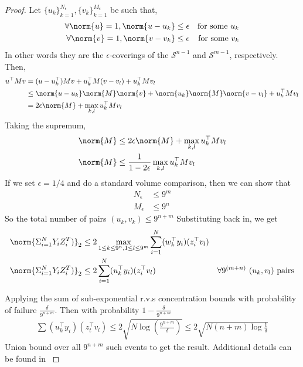 \documentclass{article}[12pt]
\begin{document}
\begin{proof}
	Let $\{u_k\}_{k=1}^{N_\epsilon}, \{v_k\}_{k=1}^{M_\epsilon}$ be such that,
	\begin{align*}
	\forall \norm{u} =1, \norm{u- u_k} &\leq \epsilon & \text {for some $u_k$}\\
	\forall \norm{v} =1, \norm{v- v_k} &\leq \epsilon & \text {for some $v_k$}
	\end{align*} 
	In other words they are the $\epsilon$-coverings of the $\mathcal{S}^{n-1}$ and $\mathcal{S}^{m-1}$, respectively. 
	Then,
	\begin{align*}
	u^\top M v &= (u-u_k^\top)Mv + u_k^\top M(v-v_l) + u_k^\top Mv_l \\
	&\leq \norm{u-u_k}\norm{M}\norm{v} + \norm{u_k}\norm{M}\norm{v-v_l} + u_k^\top Mv_l \\
	& = 2\epsilon\norm{M} + \max_{k,l} u_k^\top Mv_l
	\end{align*} 
	Taking the supremum, 
	\begin{align*}
	\norm{M} &\leq 2\epsilon \norm{M} + \max_{k,l} u_k^\top Mv_l\\
	\norm{M} &\leq \frac{1}{1-2\epsilon}\max_{k,l} u_k^\top Mv_l
	\end{align*}
	If we set $\epsilon= 1/4$ and do a standard volume comparison, then we can show that
	\begin{align*}
	N_\epsilon &\leq 9^m \\
	M_\epsilon &\leq 9^n
	\end{align*}
	So the total number of pairs $(u_k, v_k) \leq 9^{n+m}$  
	Substituting back in, we get 
	\begin{align*}
	\norm{\Sigma_{i=1}^N Y_i Z_i^T) }_2 &\leq 2 \max_{1 \leq k \leq 9^n, 1\leq l \leq 9^m} \sum_{i=1}^{N} (w_k^\top y_i )(z_i^\top v_l) \\
	\norm{\Sigma_{i=1}^N Y_i Z_i^T) }_2 &\leq 2 \sum_{i=1}^{N} (u_k^\top y_i)(z_i^\top v_l) & \text{$\forall 9^{(m+n)}$ $(u_k,v_l)$ pairs}
	\end{align*}
	
	Applying the sum of sub-exponential r.v.s concentration bounds with probability of failure $\frac{\delta}{9^{n+m}}$. Then with probability $1- \frac{\delta}{9^{n+m}}$
	\begin{align*}
	\sum(u_k^\top y_i )(z_t^\top v_l ) \leq 2 \sqrt{N\log(\frac{9^{n+m}}{\delta})} \leq 2\sqrt{N(n+m) \log \frac{1}{\delta}}
	\end{align*}
	Union bound over all $9^{n+m}$ such events to get the result. 
	Additional details can be found in \cite{matni_tutorial_2019}
\end{proof}
\end{document}
